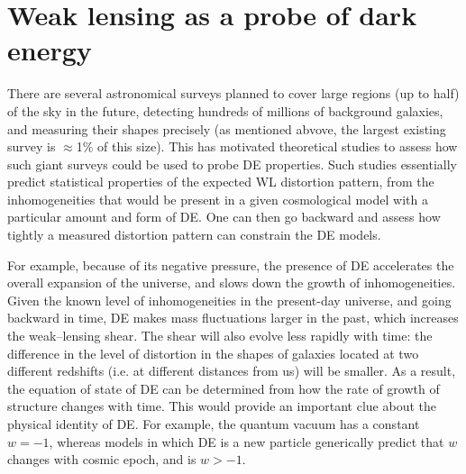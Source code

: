 \documentclass[10pt, preprint]{aastex}
\begin{document}

\section{Weak lensing as a probe of dark energy}

There are several astronomical surveys planned to cover large regions
(up to half) of the sky in the future, detecting hundreds of millions
of background galaxies, and measuring their shapes precisely (as
mentioned abvove, the largest existing survey is $\approx$1\% of this
size).  This has motivated theoretical studies to assess how such
giant surveys could be used to probe DE properties.  Such studies
essentially predict statistical properties of the expected WL
distortion pattern, from the inhomogeneities that would be present in
a given cosmological model with a particular amount and form of DE.
One can then go backward and assess how tightly a measured distortion
pattern can constrain the DE models.

For example, because of its negative pressure, the presence of DE
accelerates the overall expansion of the universe, and slows down the
growth of inhomogeneities.  Given the known level of inhomogeneities
in the present-day universe, and going backward in time, DE makes mass
fluctuations larger in the past, which increases the weak--lensing
shear. The shear will also evolve less rapidly with time: the
difference in the level of distortion in the shapes of galaxies
located at two different redshifts (i.e. at different distances from
us) will be smaller.  As a result, the equation of state of DE can be
determined from how the rate of growth of structure changes with
time. This would provide an important clue about the physical identity
of DE. For example, the quantum vacuum has a constant $w=-1$, whereas
models in which DE is a new particle generically predict that $w$
changes with cosmic epoch, and is $w>-1$.
\end{document}
